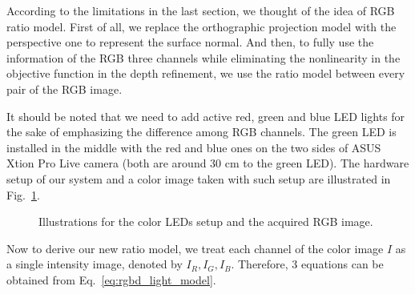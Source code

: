 According to the limitations in the last section, we thought of the idea of RGB ratio model.
First of all, we replace the orthographic projection model with the perspective one to represent the surface normal.
And then, to fully use the information of the RGB three channels while eliminating the nonlinearity in the objective function in the depth refinement, we use the ratio model between every pair of the RGB image.

It should be noted that we need to add active red, green and blue LED lights for the sake of emphasizing the difference among RGB channels.
The green LED is installed in the middle with the red and blue ones on the two sides of ASUS Xtion Pro Live camera (both are around 30 cm to the green LED).
The hardware setup of our system and a color image taken with such setup are illustrated in Fig.~\ref{fig:ratio_setup}.

\begin{figure}[!htbp]
\centering
{}
\caption{Illustrations for the color LEDs setup and the acquired RGB image.}
\label{fig:ratio_setup}
\end{figure}


Now to derive our new ratio model, we treat each channel of the color image $I$ as a single intensity image, denoted by $I_R, I_G, I_B$.
Therefore, 3 equations can be obtained from Eq.~\ref{eq:rgbd_light_model}.

